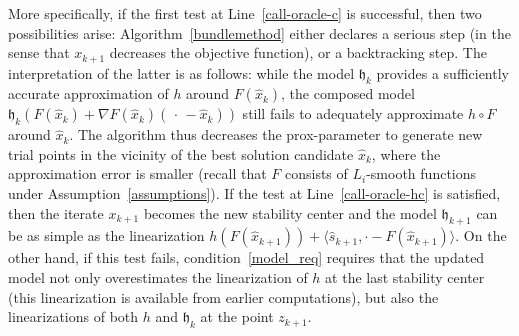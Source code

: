 \documentclass[smallextended,envcountsect]{svjour3}
\newcommand{\inner}[2]{\langle#1,#2\rangle}
\newcommand{\modelh}{\mathfrak{h}}
\begin{document}
 More specifically, if the first test at Line~\ref{call-oracle-c} is successful, then
 two possibilities arise: Algorithm~\ref{bundlemethod} either declares a serious step (in the sense that \( x_{k+1} \) decreases the objective function), or a backtracking step. The interpretation of the latter is as follows: while the model \( \modelh_k \) provides a sufficiently accurate approximation of \( h \) around $F(\hat{x}_k)$, the composed model \( \modelh_k(F(\hat{x}_k) + \nabla F(\hat{x}_k)(\,\cdot\, - \hat{x}_k)) \) still fails to adequately approximate $h\circ F$ around $\hat x_k$. The algorithm thus decreases the prox-parameter to generate new trial points in the vicinity of the best solution candidate \( \hat{x}_k \), where the approximation error is smaller (recall that \( F \) consists of \( L_i \)-smooth functions under Assumption~\ref{assumptions}). 
If the test at Line~\ref{call-oracle-hc} is satisfied, then the iterate $x_{k+1}$ becomes the new stability center and the model $\modelh_{k+1}$ can be as simple as the linearization $h(F(\hat x_{k+1}))+\inner{\hat s_{k+1}}{\cdot-F(\hat x_{k+1})}$. On the other hand, if this test fails, condition~\eqref{model_req} requires that the updated model not only overestimates the linearization of $ h$ at the last stability center (this linearization is available from earlier computations), but also the linearizations of both $h$ and $\modelh_k$ at the point $z_{k+1}$. %
\end{document}
